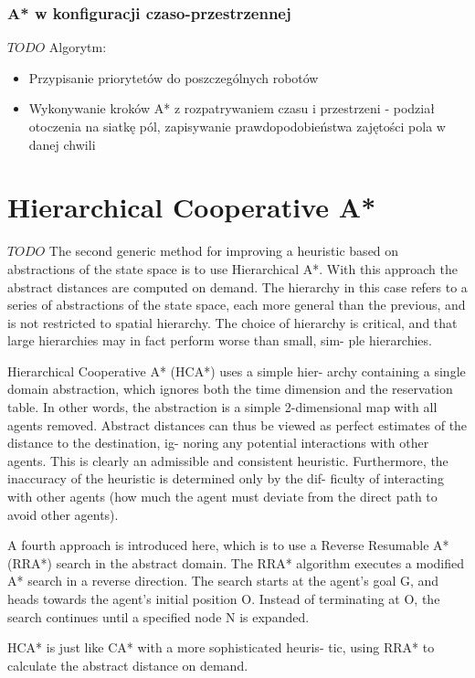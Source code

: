 \subsubsection{A* w konfiguracji czaso-przestrzennej}
$TODO$
Algorytm:
\begin{itemize}
	\item Przypisanie priorytetów do poszczególnych robotów
	\item Wykonywanie kroków A* z rozpatrywaniem czasu i przestrzeni - podział otoczenia na siatkę pól, zapisywanie prawdopodobieństwa zajętości pola w danej chwili
\end{itemize}

\section{Hierarchical Cooperative A*}
\label{ch:hier_cooperative_a}
$TODO$
The second generic method for improving a heuristic based on abstractions of the state space is to use Hierarchical A*.
With this approach the abstract distances are computed on demand. The hierarchy in this case refers to a
series of abstractions of the state space, each more general
than the previous, and is not restricted to spatial hierarchy.
The choice of hierarchy is critical, and that
large hierarchies may in fact perform worse than small, sim-
ple hierarchies.

Hierarchical Cooperative A* (HCA*) uses a simple hier-
archy containing a single domain abstraction, which ignores
both the time dimension and the reservation table. In other
words, the abstraction is a simple 2-dimensional map with
all agents removed. Abstract distances can thus be viewed
as perfect estimates of the distance to the destination, ig-
noring any potential interactions with other agents. This is
clearly an admissible and consistent heuristic. Furthermore,
the inaccuracy of the heuristic is determined only by the dif-
ficulty of interacting with other agents (how much the agent
must deviate from the direct path to avoid other agents).

A fourth approach is introduced here, which is to use a Reverse
Resumable A* (RRA*) search in the abstract domain.
The RRA* algorithm executes a modified A* search in a
reverse direction. The search starts at the agent’s goal G,
and heads towards the agent’s initial position O. Instead
of terminating at O, the search continues until a specified
node N is expanded.

HCA* is just like CA* with a more sophisticated heuris-
tic, using RRA* to calculate the abstract distance on demand.
\cite{cooppath}

